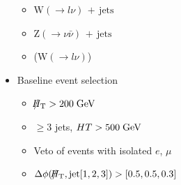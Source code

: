 \documentclass{beamer}
\begin{document}
\begin{frame}
\begin{columns}
\begin{column}{0.55\textwidth}
\begin{itemize}
\begin{itemize}
        \item<2-> $\text{W}(\rightarrow l\nu)\,+\,\text{jets}$
        \item<2-> $\text{Z}(\rightarrow\nu\bar{\nu})\,+\,\text{jets}$
        \item<2-> \ttbar ($\text{W}(\rightarrow l\nu)$)
        \end{itemize}
      \item<3-> Baseline event selection
        \begin{itemize}
        \item<3-> $\slash\mkern-12mu{H}_{\text{T}} > 200\;\text{Ge}\kern-0.06667em\text{V}$
        \item<3-> $\ge3$ jets, $HT > 500\;\text{Ge}\kern-0.06667em\text{V}$
        \item<3-> Veto of events with isolated $e$, $\mu$
        \item<3-> $\Delta\phi(\slash\mkern-12mu{H}_{\text{T}},\text{jet}[1,2,3]) > [0.5,0.5,0.3]$
        \end{itemize}
      \end{itemize}
    \end{column}    
  \end{columns}
\end{frame}
\end{document}
